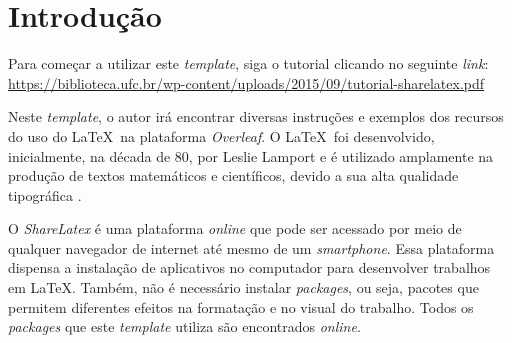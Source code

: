 \chapter{Introdução}
\label{cap:introducao}


Para começar a utilizar este \textit{template}, siga o tutorial clicando no seguinte \textit{link}:
\url{https://biblioteca.ufc.br/wp-content/uploads/2015/09/tutorial-sharelatex.pdf}

Neste \textit{template}, o autor irá encontrar diversas instruções e exemplos dos recursos do uso do \LaTeX~na plataforma \textit{Overleaf}. O \LaTeX~foi desenvolvido, inicialmente, na década de 80, por Leslie Lamport e é utilizado amplamente na produção de textos matemáticos e científicos, devido a sua alta qualidade tipográfica \cite{goossens1994latex}.

O \textit{ShareLatex} é uma plataforma \textit{online} que pode ser acessado por meio de qualquer navegador de internet até mesmo de um \textit{smartphone}. Essa plataforma dispensa a instalação de aplicativos no computador para desenvolver trabalhos em \LaTeX. Também, não é necessário instalar \textit{packages}, ou seja, pacotes que permitem diferentes efeitos na formatação e no visual do trabalho. Todos os \textit{packages} que este \textit{template} utiliza são encontrados \textit{online}.






